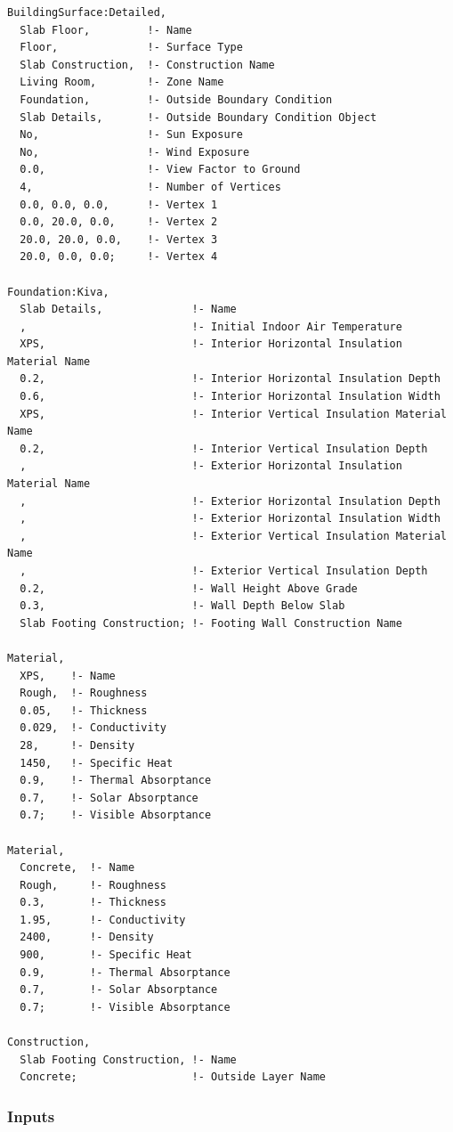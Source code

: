 \begin{lstlisting}
BuildingSurface:Detailed,
  Slab Floor,         !- Name
  Floor,              !- Surface Type
  Slab Construction,  !- Construction Name
  Living Room,        !- Zone Name
  Foundation,         !- Outside Boundary Condition
  Slab Details,       !- Outside Boundary Condition Object
  No,                 !- Sun Exposure
  No,                 !- Wind Exposure
  0.0,                !- View Factor to Ground
  4,                  !- Number of Vertices
  0.0, 0.0, 0.0,      !- Vertex 1
  0.0, 20.0, 0.0,     !- Vertex 2
  20.0, 20.0, 0.0,    !- Vertex 3
  20.0, 0.0, 0.0;     !- Vertex 4

Foundation:Kiva,
  Slab Details,              !- Name
  ,                          !- Initial Indoor Air Temperature
  XPS,                       !- Interior Horizontal Insulation Material Name
  0.2,                       !- Interior Horizontal Insulation Depth
  0.6,                       !- Interior Horizontal Insulation Width
  XPS,                       !- Interior Vertical Insulation Material Name
  0.2,                       !- Interior Vertical Insulation Depth
  ,                          !- Exterior Horizontal Insulation Material Name
  ,                          !- Exterior Horizontal Insulation Depth
  ,                          !- Exterior Horizontal Insulation Width
  ,                          !- Exterior Vertical Insulation Material Name
  ,                          !- Exterior Vertical Insulation Depth
  0.2,                       !- Wall Height Above Grade
  0.3,                       !- Wall Depth Below Slab
  Slab Footing Construction; !- Footing Wall Construction Name

Material,
  XPS,    !- Name
  Rough,  !- Roughness
  0.05,   !- Thickness
  0.029,  !- Conductivity
  28,     !- Density
  1450,   !- Specific Heat
  0.9,    !- Thermal Absorptance
  0.7,    !- Solar Absorptance
  0.7;    !- Visible Absorptance

Material,
  Concrete,  !- Name
  Rough,     !- Roughness
  0.3,       !- Thickness
  1.95,      !- Conductivity
  2400,      !- Density
  900,       !- Specific Heat
  0.9,       !- Thermal Absorptance
  0.7,       !- Solar Absorptance
  0.7;       !- Visible Absorptance

Construction,
  Slab Footing Construction, !- Name
  Concrete;                  !- Outside Layer Name
\end{lstlisting}

\subsubsection{Inputs}

